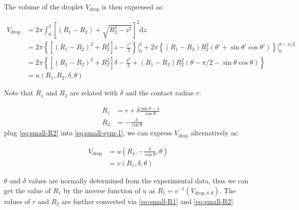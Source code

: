 The volume of the droplet \(V_{\mathrm{drop}}\) is then expressed as:

\begin{equation}
\label{eq:small-sym-1}
\begin{aligned}
V_{\mathrm{drop}} &= 2 \pi \int_{0}^{\delta} \left[ (R_{1} - R_{2}) + \sqrt{R_{2}^{2} - z^{2}}\right]^{2} \mathrm{d}z \\
  &= 2\pi \left\{ \left[(R_{1} - R_{2})^{2} + R_{2}^{2} \right] z 
- \frac{z^{3}}{3} \right\} \Bigg|_{0}^{\delta}
 + 2 \pi \left\{(R_{1} - R_{2}) R_{2}^{2} (\theta' + \sin \theta' \cos \theta')
\right\} \Bigg |_{0}^{\theta - \pi/2} \\
&= 2 \pi \left \{ [(R_{1} - R_{2})^{2} + R_{2}^{2}]\delta - \frac{\delta^{3}}{3} + (R_{1} - R_{2}) R_{2}^{2} (\theta - \pi/2 -\sin \theta \cos \theta)\right\} \\
&= u(R_{1}, R_{2}, \delta, \theta)
\end{aligned}
\end{equation}

Note that \(R_{1}\) and \(R_{2}\) are
related with \(\delta\) and the contact radius \(r\):

\begin{eqnarray}
\label{eq:small-R1}
&R_{1} &= {\displaystyle r + \delta \frac{\sin \theta - 1}{ \cos \theta}}  \\
\label{eq:small-R2}
&R_{2} &= -{\displaystyle \frac{\delta}{\cos \theta}}
\end{eqnarray}
plug  \autoref{eq:small-R2} into \autoref{eq:small-sym-1}, we can express
\(V_{\mathrm{drop}}\) alternatively as:

\begin{equation}
\label{eq:small-sym-2}
\begin{aligned}
V_{\mathrm{drop}} &= u(R_{1}, -\frac{\delta}{\cos \theta}, \theta)\\
                  &= v(R_{1}, \delta, \theta)
\end{aligned}
\end{equation}

\(\theta\) and \(\delta\) values are normally determined from the
experimental data, thus we can get the value of \(R_{1}\) by the inverse
function of \(u\) as \(R_{1} = v^{-1}(V_{\mathrm{drop}, \delta,
 \theta})\). The values of \(r\) and \(R_{2}\) are further converted
via \autoref{eq:small-R1} and \autoref{eq:small-R2}.

